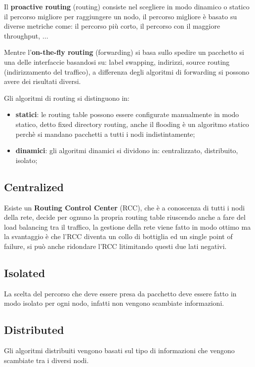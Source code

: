 \documentclass[12pt]{article}
\begin{document}
Il \textbf{proactive routing} (routing) consiste nel scegliere in modo dinamico o statico il percorso migliore per raggiungere un nodo, il percorso migliore \`e basato su diverse metriche come: il percorso pi\`u corto, il percorso con il maggiore throughput, ...

Mentre l'\textbf{on-the-fly routing} (forwarding) si basa sullo spedire un pacchetto si una delle interfaccie basandosi su: label swapping, indirizzi, source routing (indirizzamento del traffico), a differenza degli algoritmi di forwarding si possono avere dei risultati diversi.

Gli algoritmi di routing si distinguono in:
\begin{itemize}
    \item \textbf{statici}: le routing table possono essere configurate manualmente in modo statico, detto fixed directory routing, anche il flooding \`e un algoritmo statico perch\`e si mandano pacchetti a tutti i nodi indistintamente;
    \item \textbf{dinamici}: gli algoritmi dinamici si dividono in: centralizzato, distribuito, isolato;
\end{itemize}

\subsection{Centralized}
Esiste un \textbf{Routing Control Center} (RCC), che \`e a conoscenza di tutti i nodi della rete, decide per ognuno la propria routing table riuscendo anche a fare del load balancing tra il traffico, la gestione della rete viene fatto in modo ottimo ma la svantaggio \`e che l'RCC diventa un collo di bottiglia ed un single point of failure, si pu\`o anche ridondare l'RCC litimitando questi due lati negativi.

\subsection{Isolated}
La scelta del percorso che deve essere presa da pacchetto deve essere fatto in modo isolato per ogni nodo, infatti non vengono scambiate informazioni.

\subsection{Distributed}
Gli algoritmi distribuiti vengono basati sul tipo di informazioni che vengono scambiate tra i diversi nodi.
\end{document}
